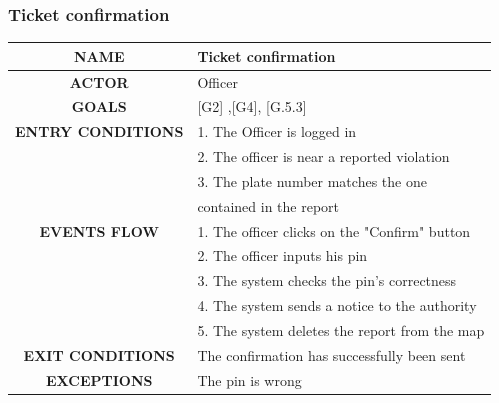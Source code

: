 \documentclass[12pt,a4paper]{article}
\begin{document}
\subsubsection{Ticket confirmation}
		\begin{center}
			\begin{tabular}{| c | l |}
				\hline
				\textbf{NAME} & Ticket confirmation \\
				\hline
				\textbf{ACTOR} & Officer \\
				\hline
				\textbf{GOALS} & [G2] ,[G4], [G.5.3] \\
				\hline
				\textbf{ENTRY CONDITIONS} &1. The Officer is logged in \\
				&2. The officer is near a reported violation \\
				&3. The plate number matches the one \\
				& contained in the report\\ \hline
				\textbf{EVENTS FLOW}  &
				1. The officer clicks on the "Confirm" button\\
				&2. The officer inputs his pin \\
				&3. The system checks the pin's correctness \\
				&4. The system sends a notice to the authority \\
				&5. The system deletes the report from the map \\ 
				\hline
				\textbf{EXIT CONDITIONS}  & The confirmation has successfully been sent \\ \hline
				\textbf{EXCEPTIONS} &
			 The pin is wrong \\
				\hline
			\end{tabular}
		\end{center}
\end{document}
